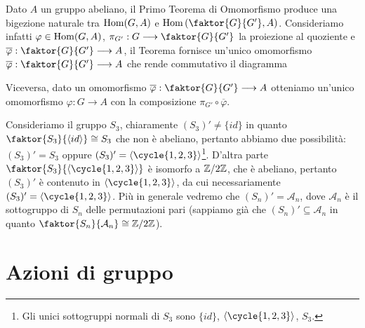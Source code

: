 \documentclass[11pt]{scrartcl}
\begin{document}
\begin{remark}
    Dato $A$ un gruppo abeliano, il Primo Teorema di Omomorfismo produce una bigezione naturale tra 
    $\operatorname{Hom}(G, A)$ e $\Hom\left(\faktor{G}{G'}, A\right)$. Consideriamo infatti $\varphi \in \operatorname{Hom}(G, A)$,
    $\pi_{G'}: G \longrightarrow \faktor{G}{G'}$ la proiezione al quoziente e 
    $\overline{\varphi} : \faktor{G}{G'}\longrightarrow A$, il Teorema
    fornisce un'unico omomorfismo $\overline{\varphi}: \faktor{G}{G'}\longrightarrow A$
    che rende commutativo il diagramma
    \begin{center}
    \end{center}
    Viceversa, dato un omomorfismo $\overline{\varphi}:\faktor{G}{G'}\longrightarrow A$
    otteniamo un'unico omomorfismo $\varphi:G\longrightarrow A$ con la 
    composizione $\pi_{G'}\circ\overline{\varphi}$.
\end{remark}

\begin{example}
    Consideriamo il gruppo $S_3$, chiaramente $(S_3)' \neq \{id\}$ in quanto
    $\faktor{S_3}{\langle id\rangle} \cong S_3$ che non è abeliano, pertanto 
    abbiamo due possibilità: $(S_3)' = S_3$ oppure $(S_3)' = \langle\cycle{1, 2, 3}\rangle$\footnote{
        Gli unici sottogruppi normali di $S_3$ sono $\{id\}$, 
        $\langle\cycle{1, 2, 3}\rangle$, $S_3$.}. D'altra parte 
        $\faktor{S_3}{\langle\cycle{1, 2, 3}\rangle}$ è isomorfo a $\mathbb{Z}/{2}\mathbb{Z}$, che
        è abeliano, pertanto $(S_3)'$ è contenuto in $\langle\cycle{1, 2, 3}\rangle$,
        da cui necessariamente $(S_3)' = \langle\cycle{1, 2, 3}\rangle$.
        Più in generale vedremo che $(S_n)' = \mathcal{A}_n$, dove $\mathcal{A}_n$ è il sottogruppo
        di $S_n$ delle permutazioni pari (sappiamo già che $(S_n)' \subseteq
        \mathcal{A}_n$ in quanto $\faktor{S_n}{\mathcal{A}_n}\cong\Z2$).
\end{example}

\newpage

\section{Azioni di gruppo}
\end{document}
